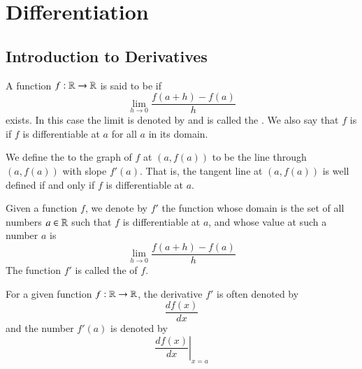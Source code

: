 \chapter{Differentiation}

\section{Introduction to Derivatives}


\begin{defn}[Differentiability]
    A function $f:\mathbb R\rightarrow \mathbb R$ is said to be  if \begin{equation}
        \lim\limits_{h\rightarrow 0}\frac{f(a+h) - f(a)}{h}
    \end{equation}
    exists. In this case the limit is denoted by  and is called the . We also say that $f$ is  if $f$ is differentiable at $a$ for all $a$ in its domain.
\end{defn}

\begin{defn}
    We define the  to the graph of $f$ at $(a,f(a))$ to be the line through $(a,f(a))$ with slope $f'(a)$. That is, the tangent line at $(a,f(a))$ is well defined if and only if $f$ is differentiable at $a$.
\end{defn}


\begin{rmk}
    Given a function $f$, we denote by $f'$ the function whose domain is the set of all numbers $a \in \mathbb R$ such that $f$ is differentiable at $a$, and whose value at such a number $a$ is \begin{equation}
        \lim\limits_{h\rightarrow 0}\frac{f(a+h) - f(a)}{h}
    \end{equation}
    The function $f'$ is called the  of $f$.
\end{rmk}

\begin{nota}
    For a given function $f:\mathbb R\rightarrow \mathbb R$, the derivative $f'$ is often denoted by \begin{equation}
        \frac{df(x)}{dx}
    \end{equation}
    and the number $f'(a)$ is denoted by \begin{equation}
        \left.\frac{df(x)}{dx}\right\vert_{x=a}
    \end{equation}
\end{nota}


